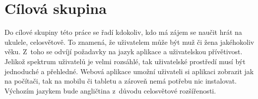 \section{Cílová skupina}
\label{sc:target_audience}
Do cílové skupiny této práce se řadí kdokoliv, kdo má zájem se naučit hrát na ukulele, celosvětově. To znamená, že uživatelem může být muž či žena jakéhokoliv věku. Z~toho se odvíjí požadavky na jazyk aplikace a uživatelskou přívětivost. Jelikož spektrum uživatelů je velmi rozsáhlé, tak uživatelské prostředí musí být jednoduché a přehledné. Webová aplikace umožní uživateli si aplikaci zobrazit jak na počítači, tak na mobilu či tabletu a zároveň nemá potřebu nic instalovat. Výchozím jazykem bude angličtina z~důvodu celosvětové rozšířenosti.
